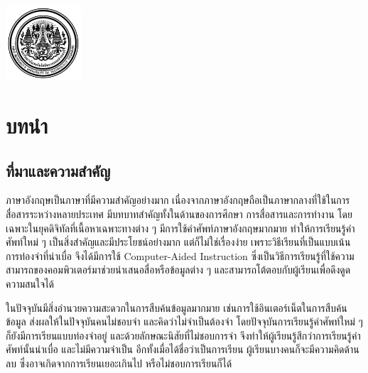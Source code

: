 \documentclass[12pt,oneside,openright,a4paper]{cpe-thai-project}
\begin{document}
\pdfstringdefDisableCommands{%
	\let\MakeUppercase\relax
}

\begin{center}
	\includegraphics[width=2.8cm]{logo02.jpg}
\end{center}
\vspace*{-1cm}

\maketitlepage
\makesignaturepage

\tableofcontents
\listoftables
\listoffigures


\chapter{บทนำ}

\section{ที่มาและความสำคัญ}

\hspace{1cm}
ภาษาอังกฤษเป็นภาษาที่มีความสำคัญอย่างมาก เนื่องจากภาษาอังกฤษถือเป็นภาษากลางที่ใช้ในการสื่อสารระหว่างหลายประเทศ
มีบทบาทสำคัญทั้งในด้านของการศึกษา การสื่อสารและการทำงาน โดยเฉพาะในยุคดิจิทัลที่เนื้อหาเฉพาะทางต่าง ๆ มีการใช้คำศัพท์ภาษาอังกฤษมากมาย
ทำให้การเรียนรู้คำศัพท์ใหม่ ๆ เป็นสิ่งสำคัญและมีประโยชน์อย่างมาก แต่ก็ไม่ใช่เรื่องง่าย เพราะวิธีเรียนที่เป็นแบบเน้นการท่องจำที่น่าเบื่อ
จึงได้มีการใช้ Computer-Aided Instruction ซึ่งเป็นวิธีการเรียนรู้ที่ใช้ความสามารถของคอมพิวเตอร์มาช่วยนำเสนอสื่อหรือข้อมูลต่าง ๆ
และสามารถโต้ตอบกับผู้เรียนเพื่อดึงดูดความสนใจได้

\hspace{1cm}
ในปัจจุบันมีสิ่งอำนวยความสะดวกในการสืบค้นข้อมูลมากมาย เช่นการใช้อินเตอร์เน็ตในการสืบค้นข้อมูล ส่งผลให้ในปัจจุบันคนไม่ชอบจำ
และคิดว่าไม่จำเป็นต้องจำ โดยปัจจุบันการเรียนรู้คำศัพท์ใหม่ ๆ ก็ยังมีการเรียนแบบท่องจำอยู่ และด้วยลักษณะนิสัยที่ไม่ชอบการจำ
จึงทำให้ผู้เรียนรู้สึกว่าการเรียนรู้คำศัพท์นั้นน่าเบื่อ และไม่มีความจำเป็น อีกทั้งเมื่อได้ชื่อว่าเป็นการเรียน ผู้เรียนบางคนก็จะมีความคิดด้านลบ
ซึ่งอาจเกิดจากการเรียนเยอะเกินไป หรือไม่ชอบการเรียนก็ได้
\end{document}
